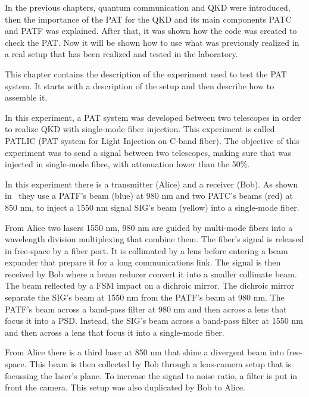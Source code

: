 In the previous chapters, quantum communication and QKD were introduced, then the importance of the PAT for the QKD and its main components PATC and PATF was explained.
After that, it was shown how the code was created to check the PAT. Now it will be shown how to use what was previously realized in a real setup that has been realized and tested in the laboratory.

This chapter contains the description of the experiment used to test the PAT system. It starts with a description of the setup and then describe how to assemble it.


In this experiment, a PAT system was developed between two telescopes in order to realize QKD with single-mode fiber injection. This experiment is called PATLIC (PAT system for Light Injection on C-band fiber).
The objective of this experiment was to send a signal between two telescopes, making sure that was injected in single-mode fibre, with attenuation lower than the 50\%.

In this experiment there is a transmitter (Alice) and a receiver (Bob). As shown in~ they use a PATF's beam (blue) at 980 nm and two PATC's beams (red) at 850 nm, to inject a 1550 nm signal SIG's beam (yellow) into a single-mode fiber.

From Alice two lasers 1550 nm, 980 nm are guided by multi-mode fibers into a wavelength division multiplexing that combine them. The fiber's signal is released in free-space by a fiber port. It is collimated by a lens before entering a beam expander that prepare it for a long communications link. The signal is then received by Bob where a beam reducer convert it into a smaller collimate beam. The beam reflected by a FSM impact on a dichroic mirror. The dichroic mirror separate the SIG's beam at 1550 nm from the PATF's beam at 980 nm. The PATF's beam across a band-pass filter at 980 nm and then across a lens that focus it into a PSD. Instead, the SIG's beam across a band-pass filter at 1550 nm and then across a lens that focus it into a single-mode fiber.

From Alice there is a third laser at 850 nm that shine a divergent beam into free-space. This beam is then collected by Bob through a lens-camera setup that is focussing the laser's plane. To increase the signal to noise ratio, a filter is put in front the camera. This setup was also duplicated by Bob to Alice.

